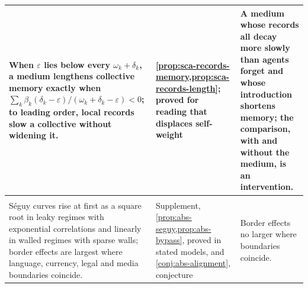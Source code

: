 \begin{longtable}{@{}>{\raggedright\arraybackslash}p{6.5cm}>{\raggedright\arraybackslash}p{3.9cm}>{\raggedright\arraybackslash}p{5.1cm}@{}}
\addlinespace
When $\varepsilon$ lies below every $\omega_k+\delta_k$, a medium lengthens collective memory exactly when $\sum_k\beta_k(\delta_k-\varepsilon)/(\omega_k+\delta_k-\varepsilon)<0$; to leading order, local records slow a collective without widening it. & \cref{prop:sca-records-memory,prop:sca-records-length}; proved for reading that displaces self-weight & A medium whose records all decay more slowly than agents forget and whose introduction shortens memory; the comparison, with and without the medium, is an intervention.\\
\midrule
\multicolumn{3}{@{}l}{\textit{Abstract collectives}}\\
S\'eguy curves rise at first as a square root in leaky regimes with exponential correlations and linearly in walled regimes with sparse walls; border effects are largest where language, currency, legal and media boundaries coincide. & Supplement, \cref{prop:abs-seguy,prop:abs-bypass}, proved in stated models, and \cref{conj:abs-alignment}, conjecture & Border effects no larger where boundaries coincide.\\
\end{longtable}
\endgroup

